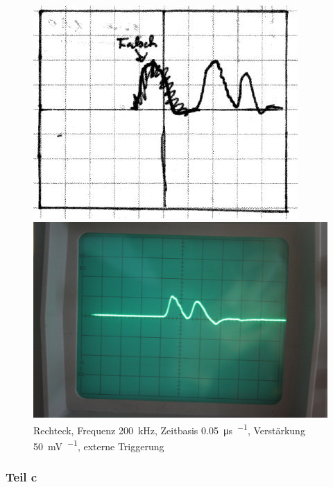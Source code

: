 \begin{figure}[htbp]
	\centering
	\begin{minipage}{.45\linewidth}
	\includegraphics[width=\linewidth]{Skizzen/IMG_0766-1500.jpg}
	\end{minipage}
	\hfill
	\begin{minipage}{.45\linewidth}
	\includegraphics[width=\linewidth]{Fotos/IMG_0766-1500.jpg}
	\end{minipage}
	\caption{%
		Rechteck, Frequenz \SI{200}{\kilo\hertz},
		Zeitbasis \SI{.05}{\micro\second\per\division},
		Verstärkung \SI{50}{\milli\volt\per\division},
		externe Triggerung
	}
	\label{fig:0766}
\end{figure}

\FloatBarrier
\subsubsection{Teil c}

